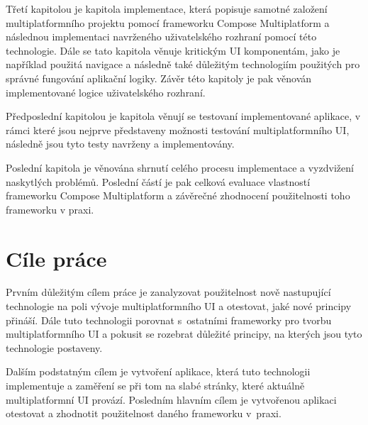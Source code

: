 \medskip

Třetí kapitolou je kapitola implementace, která popisuje samotné založení multiplatformního projektu pomocí frameworku Compose Multiplatform
a následnou implementaci navrženého uživatelského rozhraní pomocí této technologie. Dále se tato kapitola věnuje kritickým UI komponentám,
jako je například použitá navigace a následně také důležitým technologiím použitých pro správné fungování aplikační logiky. Závěr této kapitoly
je pak věnován implementované logice uživatelského rozhraní.

\medskip

Předposlední kapitolou je kapitola věnují se testovaní implementované aplikace, v rámci které jsou nejprve představeny možnosti testování
multiplatformního UI, následně jsou tyto testy navrženy a implementovány.


\medskip


Poslední kapitola je věnována shrnutí celého procesu implementace a vyzdvižení naskytlých problémů. Poslední částí je pak celková evaluace
vlastností frameworku Compose Multiplatform a závěrečné zhodnocení použitelnosti toho frameworku v praxi.

\newpage

\section{Cíle práce} \label{goals}
Prvním důležitým cílem práce je zanalyzovat použitelnost nově nastupující technologie na poli vývoje multiplatformního UI a otestovat, jaké
nové principy přináší. Dále tuto technologii porovnat s~ostatními frameworky pro tvorbu multiplatformního UI a pokusit se
rozebrat důležité principy, na kterých jsou tyto technologie postaveny. 

Dalším podstatným cílem je vytvoření aplikace, která tuto technologii implementuje a zaměření se při tom na slabé stránky, 
které aktuálně multiplatformní UI provází. 
Posledním hlavním cílem je vytvořenou aplikaci otestovat a zhodnotit použitelnost daného frameworku v~praxi.

